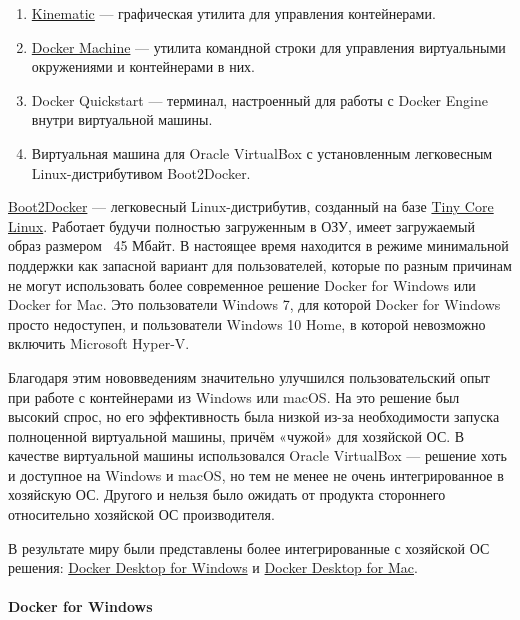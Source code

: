 \documentclass[14pt, a4paper]{article}
\begin{document}
\begin{enumerate}
    \item \href{https://kitematic.com/}{Kinematic} — графическая утилита для управления контейнерами.
    \item \href{https://docs.docker.com/machine/overview/}{Docker Machine} — утилита командной строки для управления виртуальными окружениями и
    контейнерами в них.
    \item Docker Quickstart — терминал, настроенный для работы с Docker Engine внутри виртуальной
    машины.
    \item Виртуальная машина для Oracle VirtualBox с установленным легковесным
    Linux-дистрибутивом Boot2Docker.
\end{enumerate}

\href{https://github.com/boot2docker/boot2docker}{Boot2Docker} — легковесный Linux-дистрибутив, созданный на базе \href{http://tinycorelinux.net/}{Tiny Core Linux}. Работает будучи
полностью загруженным в ОЗУ, имеет загружаемый образ размером ~45 Мбайт. В настоящее время
находится в режиме минимальной поддержки как запасной вариант для пользователей, которые по
разным причинам не могут использовать более современное решение Docker for Windows или Docker
for Mac. Это пользователи Windows 7, для которой Docker for Windows просто недоступен, и
пользователи Windows 10 Home, в которой невозможно включить Microsoft Hyper-V.

Благодаря этим нововведениям значительно улучшился пользовательский опыт при работе с
контейнерами из Windows или macOS. На это решение был высокий спрос, но его эффективность
была низкой из-за необходимости запуска полноценной виртуальной машины, причём «чужой» для
хозяйской ОС. В качестве виртуальной машины использовался Oracle VirtualBox — решение хоть и
доступное на Windows и macOS, но тем не менее не очень интегрированное в хозяйскую ОС. Другого
и нельзя было ожидать от продукта стороннего относительно хозяйской ОС производителя.

В результате миру были представлены более интегрированные с хозяйской ОС решения: \href{https://docs.docker.com/docker-for-windows/}{Docker
Desktop for Windows} и \href{https://docs.docker.com/docker-for-mac/}{Docker Desktop for Mac}.


\paragraph*{Docker for Windows} \mbox{}\\
\end{document}
